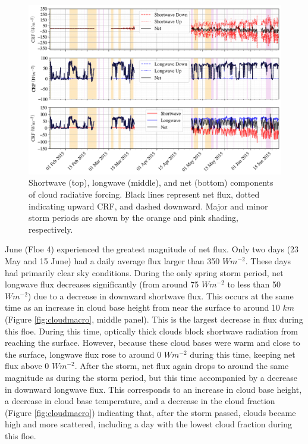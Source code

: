 \begin{figure}[b!]
    \centering
    \includegraphics[width=1\linewidth]{figures/chapter4/RadForcing.png}
    \caption[Shortwave, longwave, and net components of cloud radiative forcing.]{Shortwave (top), longwave (middle), and net (bottom) components of cloud radiative forcing. Black lines represent net flux, dotted indicating upward CRF, and dashed downward. Major and minor storm periods are shown by the orange and pink shading, respectively.}
    \label{fig:crf_timeseries}
\end{figure}

June (Floe 4) experienced the greatest magnitude of net flux. Only two days (23 May and 15 June) had a daily average flux larger than 350 $Wm^{-2}$. These days had primarily clear sky conditions. During the only spring storm period, net longwave flux decreases significantly (from around 75 $Wm^{-2}$ to less than 50 $Wm^{-2}$) due to a decrease in downward shortwave flux. This occurs at the same time as an increase in cloud base height from near the surface to around 10 $km$ (Figure \ref{fig:cloudmacro}, middle panel). This is the largest decrease in flux during this floe. During this time, optically thick clouds block shortwave radiation from reaching the surface. However, because these cloud bases were warm and close to the surface, longwave flux rose to around 0 $Wm^{-2}$ during this time, keeping net flux above 0 $Wm^{-2}$. After the storm, net flux again drops to around the same magnitude as during the storm period, but this time accompanied by a decrease in downward longwave flux. This corresponds to an increase in cloud base height, a decrease in cloud base temperature, and a decrease in the cloud fraction (Figure \ref{fig:cloudmacro}) indicating that, after the storm passed, clouds became high and more scattered, including a day with the lowest cloud fraction during this floe. 

